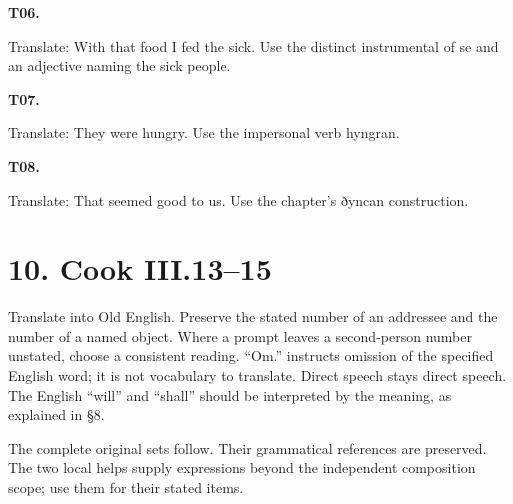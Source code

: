 \par\begin{minipage}{\linewidth}\raggedright
\textbf{T06.}

Translate: With that food I fed the sick. Use the distinct instrumental of se and an adjective naming the sick people.

\end{minipage}\par\addvspace{4pt}

\par\begin{minipage}{\linewidth}\raggedright
\textbf{T07.}

Translate: They were hungry. Use the impersonal verb hyngran.

\end{minipage}\par\addvspace{4pt}

\par\begin{minipage}{\linewidth}\raggedright
\textbf{T08.}

Translate: That seemed good to us. Use the chapter’s ðyncan construction.

\end{minipage}\par\addvspace{4pt}

\section*{10. Cook III.13–15}

Translate into Old English. Preserve the stated number of an addressee and the number of a named object. Where a prompt leaves a second-person number unstated, choose a consistent reading. “Om.” instructs omission of the specified English word; it is not vocabulary to translate. Direct speech stays direct speech. The English “will” and “shall” should be interpreted by the meaning, as explained in §8.

The complete original sets follow. Their grammatical references are preserved. The two local helps supply expressions beyond the independent composition scope; use them for their stated items.

